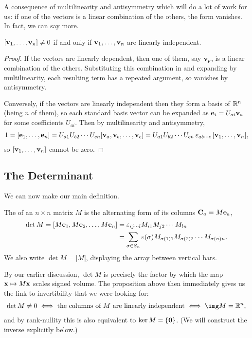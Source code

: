 \documentclass[a4paper]{scrartcl}
\begin{document}
A consequence of multilinearity and antisymmetry which will do a lot of work for us: if one of the vectors is a linear combination of the others, the form vanishes. In fact, we can say more.

\begin{proposition}
	$[\mathbf{v}_1, \dots, \mathbf{v}_n] \neq 0$ if and only if $\mathbf{v}_1, \dots, \mathbf{v}_n$ are linearly independent.
\end{proposition}
\begin{proof}
	If the vectors are linearly dependent, then one of them, say $\mathbf{v}_p$, is a linear combination of the others. Substituting this combination in and expanding by multilinearity, each resulting term has a repeated argument, so vanishes by antisymmetry.

	Conversely, if the vectors are linearly independent then they form a basis of $\mathbb{R}^n$ (being $n$ of them), so each standard basis vector can be expanded as $\mathbf{e}_i = U_{ai}\mathbf{v}_a$ for some coefficients $U_{ai}$. Then by multilinearity and antisymmetry,
	$$
	1 = [\mathbf{e}_1, \dots, \mathbf{e}_n] = U_{a1}U_{b2}\cdots U_{cn}[\mathbf{v}_a, \mathbf{v}_b, \dots, \mathbf{v}_c] = U_{a1}U_{b2}\cdots U_{cn}\, \varepsilon_{ab \cdots c} \, [\mathbf{v}_1, \dots, \mathbf{v}_n],
	$$
	so $[\mathbf{v}_1, \dots, \mathbf{v}_n]$ cannot be zero.
\end{proof}

\subsection{The Determinant}

We can now make our main definition.

\begin{definition}[Determinant]
	The  of an $n \times n$ matrix $M$ is the alternating form of its columns $\mathbf{C}_a = M \mathbf{e}_a$,
	\begin{align*}
		\det M = [M \mathbf{e}_1, M\mathbf{e}_2, \dots, M \mathbf{e}_n] &= \varepsilon_{ij \cdots l}M_{i1}M_{j2}\cdots M_{ln} \\
		&= \sum_{\sigma \in S_n} \varepsilon(\sigma) M_{\sigma(1)1}M_{\sigma(2)2}\cdots M_{\sigma(n)n}.
	\end{align*}
	We also write $\det M = |M|$, displaying the array between vertical bars.
\end{definition}

By our earlier discussion, $\det M$ is precisely the factor by which the map $\mathbf{x} \mapsto M\mathbf{x}$ scales signed volume. The proposition above then immediately gives us the link to invertibility that we were looking for:
$$
\det M \neq 0 \iff \text{the columns of } M \text{ are linearly independent} \iff \img M = \R^n,
$$
and by rank-nullity this is also equivalent to $\ker M = \{\mathbf{0}\}$. (We will construct the inverse explicitly below.)
\end{document}
